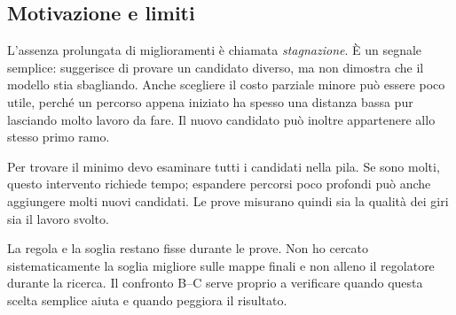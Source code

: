 \subsection{Motivazione e limiti}
L'assenza prolungata di miglioramenti è chiamata \emph{stagnazione}.
È un segnale semplice: suggerisce di provare un candidato diverso,
ma non dimostra che il modello stia sbagliando. Anche scegliere il costo
parziale minore può essere poco utile, perché un percorso appena iniziato
ha spesso una distanza bassa pur lasciando molto lavoro da fare.
Il nuovo candidato può inoltre appartenere allo stesso primo ramo.

Per trovare il minimo devo esaminare tutti i candidati nella pila.
Se sono molti, questo intervento richiede tempo; espandere percorsi poco
profondi può anche aggiungere molti nuovi candidati. Le prove misurano
quindi sia la qualità dei giri sia il lavoro svolto.

La regola e la soglia restano fisse durante le prove. Non ho cercato
sistematicamente la soglia migliore sulle mappe finali e non alleno il
regolatore durante la ricerca. Il confronto B--C serve proprio a verificare
quando questa scelta semplice aiuta e quando peggiora il risultato.
